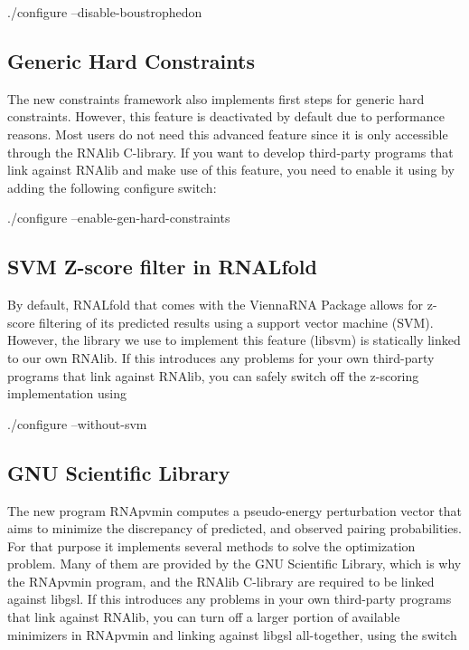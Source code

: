 \begin{DoxyVerb}./configure --disable-boustrophedon
\end{DoxyVerb}
\hypertarget{install_config_generic_hc}{}\subsection{Generic Hard Constraints}\label{install_config_generic_hc}
The new constraints framework also implements first steps for generic hard constraints. However, this feature is deactivated by default due to performance reasons. Most users do not need this advanced feature since it is only accessible through the R\+N\+Alib C-\/library. If you want to develop third-\/party programs that link against R\+N\+Alib and make use of this feature, you need to enable it using by adding the following configure switch\+:

\begin{DoxyVerb}./configure --enable-gen-hard-constraints
\end{DoxyVerb}
\hypertarget{install_config_svm}{}\subsection{S\+V\+M Z-\/score filter in R\+N\+A\+Lfold}\label{install_config_svm}
By default, R\+N\+A\+Lfold that comes with the Vienna\+R\+NA Package allows for z-\/score filtering of its predicted results using a support vector machine (S\+VM). However, the library we use to implement this feature (libsvm) is statically linked to our own R\+N\+Alib. If this introduces any problems for your own third-\/party programs that link against R\+N\+Alib, you can safely switch off the z-\/scoring implementation using

\begin{DoxyVerb}./configure --without-svm
\end{DoxyVerb}
\hypertarget{install_config_gsl}{}\subsection{G\+N\+U Scientific Library}\label{install_config_gsl}
The new program R\+N\+Apvmin computes a pseudo-\/energy perturbation vector that aims to minimize the discrepancy of predicted, and observed pairing probabilities. For that purpose it implements several methods to solve the optimization problem. Many of them are provided by the G\+NU Scientific Library, which is why the R\+N\+Apvmin program, and the R\+N\+Alib C-\/library are required to be linked against libgsl. If this introduces any problems in your own third-\/party programs that link against R\+N\+Alib, you can turn off a larger portion of available minimizers in R\+N\+Apvmin and linking against libgsl all-\/together, using the switch

